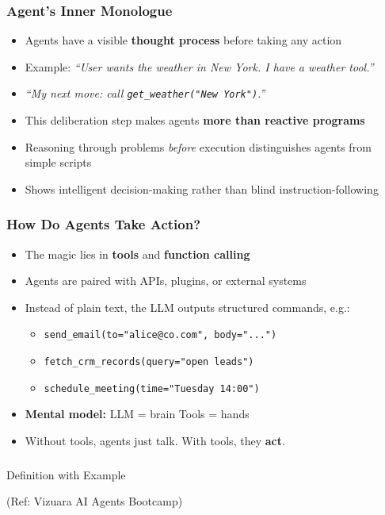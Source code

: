 \begin{frame}[fragile]\frametitle{Agent's Inner Monologue}
      \begin{itemize}
        \item Agents have a visible \textbf{thought process} before taking any action
        \item Example: \emph{``User wants the weather in New York. I have a weather tool.''}
        \item \emph{``My next move: call \texttt{get\_weather("New York")}.''}
        \item This deliberation step makes agents \textbf{more than reactive programs}
        \item Reasoning through problems \emph{before} execution distinguishes agents from simple scripts
        \item Shows intelligent decision-making rather than blind instruction-following
      \end{itemize}
\end{frame}

\begin{frame}[fragile]\frametitle{How Do Agents Take Action?}
\begin{itemize}
    \item The magic lies in \textbf{tools} and \textbf{function calling}
    \item Agents are paired with APIs, plugins, or external systems
    \item Instead of plain text, the LLM outputs structured commands, e.g.:
    \begin{itemize}
        \item \texttt{send\_email(to="alice@co.com", body="...")}
        \item \texttt{fetch\_crm\_records(query="open leads")}
        \item \texttt{schedule\_meeting(time="Tuesday 14:00")}
    \end{itemize}
    \item \textbf{Mental model:} LLM = brain \quad Tools = hands
    \item Without tools, agents just talk. With tools, they \textbf{act}.
\end{itemize}
\end{frame}

\begin{frame}[fragile]\frametitle{}
\begin{center}
{\Large Definition with Example}

{\tiny (Ref: Vizuara AI Agents Bootcamp)}

\end{center}
\end{frame}

